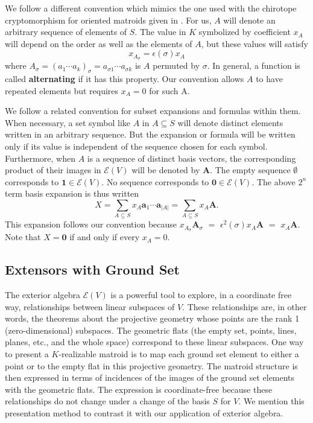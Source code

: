 \documentclass[12pt]{article}
\theoremstyle{definition}
\newcommand{\FieldK}{\ensuremath{K}}
\newcommand{\Card}[1]{\ensuremath{{\left|#1\right|}}}
\newcommand{\ext}[1]{\ensuremath{\mathbf{#1}}}
\begin{document}
We follow a different convention which mimics the one used with
the chirotope cryptomorphism for oriented matroids given in \cite{OMBOOK}.  
For us, $A$ will
denote an arbitrary sequence of elements of $S$.  The
value in $\FieldK$ symbolized by coefficient $x_A$ will depend on the order
as well as the elements of $A$, but these values will satisfy
\[
    x_{A_\sigma}=\epsilon(\sigma)x_A
\]
where $A_{\sigma}=(a_1\cdots a_k)_{\sigma}=a_{\sigma{1}}\cdots a_{\sigma{k}}$
is $A$ permuted by $\sigma$.
In general,
a function is called \textbf{alternating} if it has this property.
Our convention allows
$A$ to have repeated elements but requires $x_A=0$ for such A.  

We follow a related convention for subset expansions and formulas within them.
When necessary, a set symbol like $A$ in $A\subseteq S$ will denote
distinct elements written in an arbitrary sequence.  But the expansion
or formula will be written only if its value is independent of the sequence
chosen for each symbol.  Furthermore, when $A$ is a sequence of
distinct basis 
vectors, the corresponding product of their images in $\mathcal{E}(V)$
will be denoted by $\mathbf{A}$.  The empty sequence $\emptyset$ corresponds
to $\mathbf{1}\in\mathcal{E}(V)$.  No sequence corresponds to 
$\mathbf{0}\in\mathcal{E}(V)$.
The above $2^n$ term basis expansion is thus written 
\[
X = \sum_{A\subseteq S}x_A\ext{a}_1\cdots \ext{a}_{\Card{A}}
  = \sum_{A\subseteq S}x_A\ext{A}.
\]
This expansion follows our convention because
$x_{A_\sigma}\mathbf{A}_\sigma$ $=$ $\epsilon^2(\sigma)x_A\mathbf{A}$ $=$ 
$x_A\mathbf{A}$.  
Note that $X=\mathbf{0}$ if and only if every $x_A=0$.

\subsection{Extensors with Ground Set}
\label{ExtWithGroundSetSect}

The exterior algebra $\mathcal{E}(V)$ 
is a powerful tool to explore, in a coordinate free way, relationships 
between linear subspaces of $V$\cite{RotaCayley,WhiteCayleyGeoAppl}.  
These relationships are, in other words, the
theorems about the projective geometry whose points are 
the rank 1 (zero-dimensional) subspaces.   The geometric flats 
(the empty set, points, lines, planes, etc., and the whole space) 
correspond to these linear subspaces.  One way to present
a $\FieldK$-realizable matroid is to map each ground set element
to either a point or to the empty flat in this projective geometry.  
The matroid structure is then expressed in terms of incidences of
the images of the ground set elements with the geometric flats.
The expression is coordinate-free because these
relationships do not change under a change of the basis $S$ for $V$.
We mention this presentation method
to contrast it with our application of exterior algebra.
\end{document}
